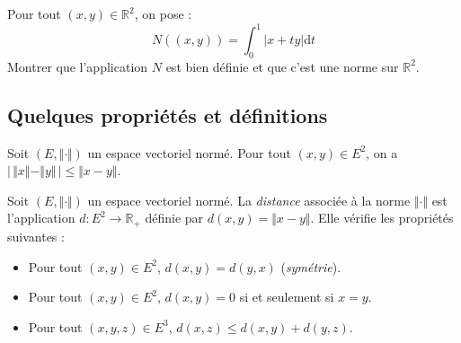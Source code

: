 \documentclass[french,11pt,twoside]{VcCours}
\newcommand{\dt}{\text{d}t}
\begin{document}
\begin{ApplicationDirecte} Pour tout $(x,y) \in \mathbb{R}^2$, on pose :
$$ N((x,y)) = \int_{0}^1 \vert x+ty \vert \dt$$
Montrer que l'application $N$ est bien définie et que c'est une norme sur $\mathbb{R}^2$.
\end{ApplicationDirecte}
\subsection{Quelques propriétés et définitions}

\begin{Proposition}{} Soit $(E, \Vert \cdot \Vert)$ un espace vectoriel normé. Pour tout $(x,y) \in E^2$, on a $\vert \,  \Vert x \Vert - \Vert y \Vert \, \vert \leq \Vert x-y \Vert$.
\end{Proposition}

\begin{Demonstration}{} 

\vspace{7cm}
\end{Demonstration}

\begin{TheoremeDefinition}{}
Soit $(E, \Vert \cdot \Vert)$ un espace vectoriel normé. La \emph{distance} associée à la norme $\Vert \cdot \Vert$ est l'application $d : E^2 \rightarrow \mathbb{R}_+$ définie par $d(x,y) = \Vert x- y \Vert$. Elle vérifie les propriétés suivantes :

\begin{itemize}
\item Pour tout $(x,y) \in E^2$, $d(x,y)=d(y,x)$ (\emph{symétrie}).
\item Pour tout $(x,y) \in E^2$, $d(x,y)= 0$ si et seulement si $x=y$.
\item Pour tout $(x,y,z) \in E^3$, $d(x,z) \leq d(x,y) + d(y,z)$.
\end{itemize}
\end{TheoremeDefinition}
%
\begin{Demonstration}{}
\vspace{6cm}
\end{Demonstration}
\end{document}
